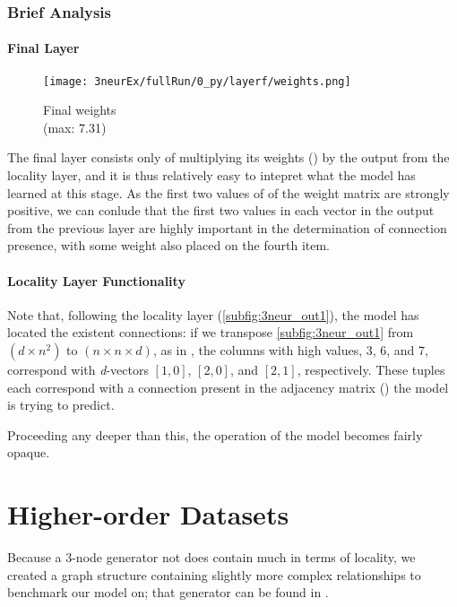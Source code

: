 \subsubsection{Brief Analysis}
\paragraph{Final Layer}
\begin{wrapfigure}[5]{r}{.25\textwidth}
	\centering
	\vspace{-15pt}
	\texttt{[image: 3neurEx/fullRun/0\_py/layerf/weights.png]}
	\caption{Final weights\\(max: 7.31)}
	\label{fig:3neur_flayer}
\end{wrapfigure}
The final layer consists only of multiplying its weights 
() by the output from the locality layer, and it is 
thus relatively easy to intepret what the model has learned at this stage. As 
the first two values of of the weight matrix are strongly positive, we can 
conlude that the first two values in each vector in the output from the previous 
layer are highly important in the determination of connection presence, with 
some weight also placed on the fourth item.

\paragraph{Locality Layer Functionality}

Note that, following the locality layer (\ref{subfig:3neur_out1}), the model has 
located the existent connections: if we transpose \ref{subfig:3neur_out1} from 
$(d \times n^2)$ to $(n \times n \times d)$, as in , the 
columns with high values, 3, 6, and 7, correspond with \textit{d}-vectors 
$[1,0]$, $[2,0]$, and $[2,1]$, respectively. These tuples each correspond with a 
connection present in the adjacency matrix () the model is 
trying to predict.
\vspace{\baselineskip}

\noindent Proceeding any deeper than this, the operation of the model becomes 
fairly opaque.

\section{Higher-order Datasets}
\label{sec:localitybroken}
Because a 3-node generator not does contain much in terms of locality, we 
created a graph structure containing slightly more complex relationships to 
benchmark our model on; that generator can be found in .
 
